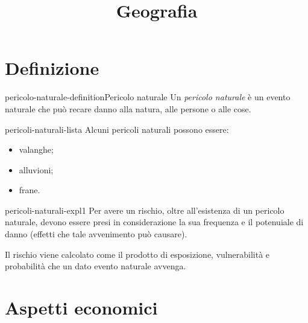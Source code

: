 \documentclass[preview]{standalone}
\begin{document}
\title{Geografia}
\genpage

\section{Definizione}

\begin{snippetdefinition}{pericolo-naturale-definition}{Pericolo naturale}
    Un \textit{pericolo naturale} è un evento naturale che può recare danno alla
    natura, alle persone o alle cose.
\end{snippetdefinition}

\begin{snippet}{pericoli-naturali-lista}
    Alcuni pericoli naturali possono essere:
    \begin{itemize}
        \item valanghe;
        \item alluvioni;
        \item frane.
    \end{itemize}
\end{snippet}

\begin{snippet}{pericoli-naturali-expl1}
    Per avere un rischio, oltre all'esistenza di un pericolo naturale, devono essere presi
    in considerazione la sua frequenza e il potenuiale di danno (effetti che tale
    avvenimento può causare).

    Il rischio viene calcolato come il prodotto di
    esposizione, vulnerabilità e probabilità che un dato evento naturale avvenga.
\end{snippet}

\section{Aspetti economici}


\end{document}
